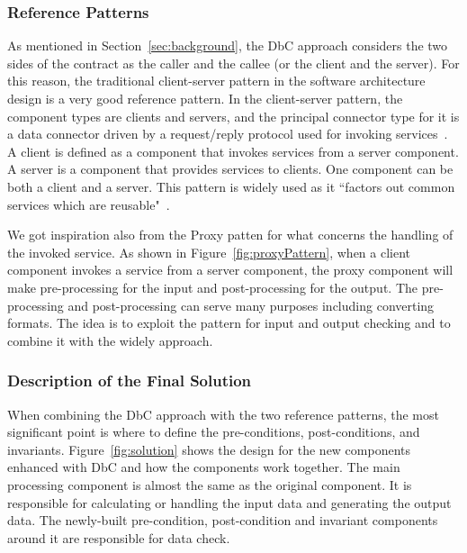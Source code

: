 \subsubsection{Reference Patterns}
As mentioned in Section~\ref{sec:background}, the DbC approach considers the two sides of the contract as the caller and the callee (or the client and the server). For this reason, the traditional client-server pattern in the software architecture design is a very good reference pattern. In the client-server pattern, the component types are clients and servers, and the principal connector type for it is a data connector driven by a request/reply protocol used for invoking services~\cite{ii8}. A client is defined as a component that invokes services from a server component. A server is a component that provides services to clients. One component can be both a client and a server. This pattern is widely used as it ``factors out common services which are reusable"~\cite{ii8}. 

We got inspiration also from the Proxy patten for what concerns the 
handling of the invoked service. %
As shown in Figure~\ref{fig:proxyPattern}, when a client component invokes a service from a server component, the proxy component will make pre-processing for the input and post-processing for the output. The pre-processing and post-processing can serve many purposes including converting formats. The idea is to exploit the pattern for input and output checking and to combine it with the widely approach.  %


\subsubsection{Description of the Final Solution}
When combining the DbC approach with the two reference patterns, the most significant point is where to define the pre-conditions, post-conditions, and invariants. Figure~\ref{fig:solution} shows the design for the new components enhanced with DbC and how the components work together. The main processing component is almost the same as the original component. It is responsible for calculating or handling the input data and generating the output data. The newly-built pre-condition, post-condition and invariant components around it are responsible for data check. 

